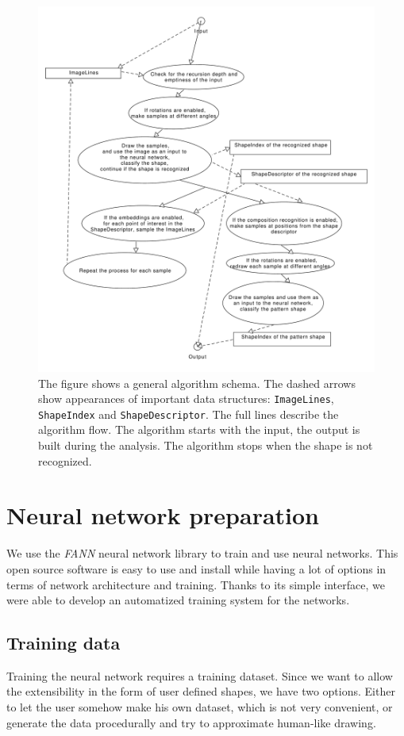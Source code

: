 \begin{figure}
\centering
\includegraphics[width=.9\linewidth]{ext/images/algoschema.pdf}
\caption{The figure shows a general algorithm schema. The dashed arrows show appearances of important data structures: \texttt{ImageLines}, \texttt{ShapeIndex} and \texttt{ShapeDescriptor}. The full lines describe the algorithm flow. The algorithm starts with the input, the output is built during the analysis. The algorithm stops when the shape is not recognized.}
\label{fig:algoschema}
\end{figure}

\section{Neural network preparation}
We use the \emph{FANN} neural network library to train and use neural networks. This open source software is easy to use and install while having a lot of options in terms of network architecture and training. Thanks to its simple interface, we were able to develop an automatized training system for the networks.

\subsection{Training data}
Training the neural network requires a training dataset. Since we want to allow the extensibility in the form of user defined shapes, we have two options. Either to let the user somehow make his own dataset, which is not very convenient, or generate the data procedurally and try to approximate human-like drawing.


